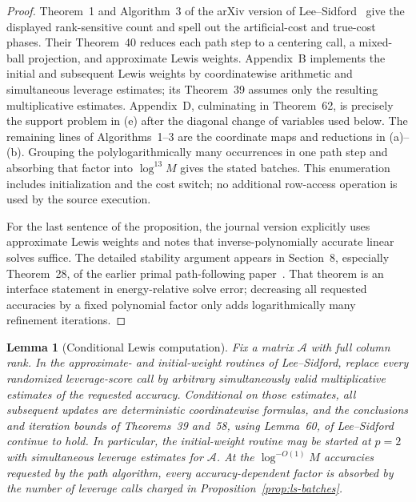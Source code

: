 \documentclass[11pt]{article}
\newtheorem{lemma}[theorem]{Lemma}
\theoremstyle{definition}
\begin{document}
\begin{proof}
Theorem~1 and Algorithm~3 of the arXiv version of
Lee--Sidford~\cite{LeeSidford2020} give the displayed rank-sensitive count and
spell out the artificial-cost and true-cost phases.  Their Theorem~40 reduces
each path step to a centering call, a mixed-ball projection, and approximate
Lewis weights.  Appendix~B implements the initial and subsequent Lewis
weights by coordinatewise arithmetic and simultaneous leverage estimates;
its Theorem~39 assumes only the resulting multiplicative estimates.
Appendix~D, culminating in Theorem~62, is precisely the support problem in
(e) after the diagonal change of variables used below.  The remaining lines
of Algorithms~1--3 are the coordinate maps and reductions in (a)--(b).
Grouping the polylogarithmically many occurrences in one path step and
absorbing that factor into $\log^{13}M$ gives the stated batches.  This
enumeration includes initialization and the cost switch; no additional
row-access operation is used by the source execution.

For the last sentence of the proposition, the journal version explicitly
uses approximate Lewis weights and notes that inverse-polynomially accurate
linear solves suffice.  The detailed stability argument appears in
Section~8, especially Theorem~28, of the earlier primal path-following
paper~\cite{LeeSidfordPathII}.  That theorem is an interface statement in
energy-relative solve error; decreasing all requested accuracies by a fixed
polynomial factor only adds logarithmically many refinement iterations.
\end{proof}

\begin{lemma}[Conditional Lewis computation]\label{lem:conditional-lewis}
Fix a matrix $\mathcal A$ with full column rank.  In the approximate- and
initial-weight routines of Lee--Sidford, replace every randomized
leverage-score call by arbitrary simultaneously valid
multiplicative estimates of the requested accuracy.  Conditional on those
estimates, all subsequent updates are deterministic coordinatewise formulas,
and the conclusions and iteration bounds of Theorems~39 and~58, using
Lemma~60, of
Lee--Sidford~\cite{LeeSidford2020} continue to hold.  In particular,
the initial-weight routine may be started at $p=2$ with simultaneous
leverage estimates for $\mathcal A$.  At the $\log^{-O(1)}M$ accuracies requested by
the path algorithm, every accuracy-dependent factor is absorbed by the number
of leverage calls charged in Proposition~\ref{prop:ls-batches}.
\end{lemma}
\end{document}
